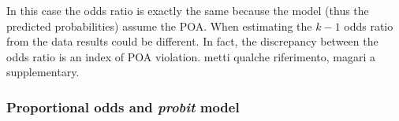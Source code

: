 \documentclass[
  man,floatsintext]{apa6}
\newenvironment{Shaded}{\begin{snugshade}}{\end{snugshade}}
\newcommand{\AttributeTok}[1]{\textcolor[rgb]{0.13,0.29,0.53}{#1}}
\newcommand{\CommentTok}[1]{\textcolor[rgb]{0.56,0.35,0.01}{\textit{#1}}}
\newcommand{\DecValTok}[1]{\textcolor[rgb]{0.00,0.00,0.81}{#1}}
\newcommand{\DocumentationTok}[1]{\textcolor[rgb]{0.56,0.35,0.01}{\textbf{\textit{#1}}}}
\newcommand{\FunctionTok}[1]{\textcolor[rgb]{0.13,0.29,0.53}{\textbf{#1}}}
\newcommand{\NormalTok}[1]{#1}
\newcommand{\OtherTok}[1]{\textcolor[rgb]{0.56,0.35,0.01}{#1}}
\newcommand{\SpecialCharTok}[1]{\textcolor[rgb]{0.81,0.36,0.00}{\textbf{#1}}}
\newcommand{\StringTok}[1]{\textcolor[rgb]{0.31,0.60,0.02}{#1}}
\begin{document}
\scriptsize

\begin{Shaded}
\end{Shaded}

\normalsize

In this case the odds ratio is exactly the same because the model (thus the predicted probabilities) assume the POA. When estimating the \(k - 1\) odds ratio from the data results could be different. In fact, the discrepancy between the odds ratio is an index of POA violation. metti qualche riferimento, magari a supplementary.

\subsubsection{\texorpdfstring{Proportional odds and \emph{probit} model}{Proportional odds and probit model}}\label{proportional-odds-and-probit-model}
\end{document}
